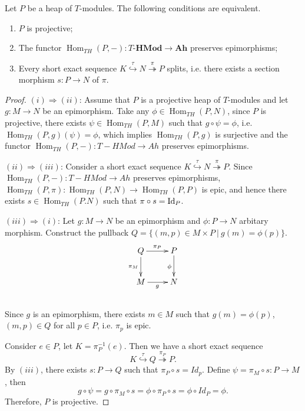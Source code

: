 \documentclass[11pt, twoside]{article}
\begin{document}
\begin{proposition}\label{th3}\rm
Let $P$ be a heap of $T$-modules. The following conditions are equivalent.
\begin{enumerate}
    \item[\rm(i)] $P$ is projective;
    \item[\rm(ii)] The functor $\operatorname{Hom}_{TH}(P,-): T\textbf{-HMod} \rightarrow \textbf{Ah}$ preserves epimorphisms;
    \item[\rm(iii)] Every short exact sequence $K \stackrel{\tau}{\hookrightarrow} N \stackrel{\pi}{\twoheadrightarrow} P$ splits, i.e. there exists a section morphism $s: P\rightarrow N$ of $\pi$.
\end{enumerate}
\end{proposition}
\begin{proof}
{$(i)\Rightarrow (ii)$: Assume that $P$ is a projective heap of $T$-modules and let $g: M \rightarrow N$ be an epimorphism. Take any $\phi \in \operatorname{Hom}_{TH}(P,N)$, since $P$ is projective, there exists $\psi \in \operatorname{Hom}_{TH}(P,M)$ such that $g \circ \psi = \phi$, i.e. $\operatorname{Hom}_{TH}(P,g)(\psi)=\phi$, which implies $\operatorname{Hom}_{TH}(P,g)$ is surjective and the functor $\operatorname{Hom}_{TH}(P,-): T-HMod \rightarrow Ah$ preserves epimorphisms.

$(ii)\Rightarrow (iii)$: Consider a short exact sequence $K \stackrel{\tau}{\hookrightarrow} N \stackrel{\pi}{\twoheadrightarrow} P$. Since $\operatorname{Hom}_{TH}(P,-): T-HMod \rightarrow Ah$ preserves epimorphisms, $\operatorname{Hom}_{TH}(P,\pi): \operatorname{Hom}_{TH}(P,N) \rightarrow \operatorname{Hom}_{TH}(P,P)$ is epic, and hence there exists $s \in \operatorname{Hom}_{TH}(P.N)$ such that $\pi \circ s = {\rm Id}_P$.

$(iii)\Rightarrow (i)$: Let $g: M \to N$ be an epimorphism and $\phi :P \to N$ arbitary morphism. Construct the pullback $Q = \{(m,p) \in M \times P~|~g(m) = \phi(p)\}$.\\
$$ \xymatrix{ Q \ar[d]_{\pi_M} \ar[r]^{\pi_P} & P \ar[d]_{\phi} \\
  M \ar[r]_{g} & N }$$ \\
Since $g$ is an epimorphism, there exists $m\in M$ such that $g(m) = \phi(p)$, $(m,p) \in Q$ for all $p \in P$, i.e. $\pi_p$ is epic.

Consider $e \in P$, let $K = \pi_P^{-1}(e)$. Then we have a short exact sequence
$$ K \stackrel{\tau}{\hookrightarrow} Q \stackrel{\pi_P}{\twoheadrightarrow} P. $$
By $(iii)$, there exists $s: P\rightarrow Q$ such that $\pi_P \circ s = Id_p$. Define $\psi = \pi_M \circ s: P \rightarrow M$, then
$$ g \circ \psi = g \circ \pi_M \circ s = \phi \circ \pi_P \circ s = \phi \circ Id_P = \phi.$$
Therefore, $P$ is projective.
}
\end{proof}
\end{document}
